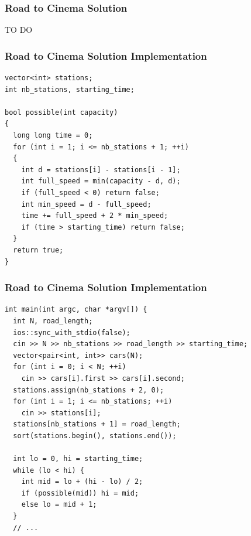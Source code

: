 \documentclass{beamer}
\newcommand{\codeforceslink}[2]{CodeForces (http://www.codeforces.com)
  problem: \href{#2}{\textcolor{blue}{#1}.}}
\newcounter{exo}
\newcommand{\exo}{
  \addtocounter{exo}{1}
  Exercice \arabic{exo}
}
\begin{document}
\fi



\ifanswers

\begin{frame}%
\frametitle{Road to Cinema Solution}

TO DO

\end{frame}

\begin{frame}[containsverbatim]
\frametitle{Road to Cinema Solution Implementation}
\scriptsize

\begin{lstlisting}[mathescape]
vector<int> stations;
int nb_stations, starting_time;

bool possible(int capacity)
{
  long long time = 0;
  for (int i = 1; i <= nb_stations + 1; ++i)
  {
    int d = stations[i] - stations[i - 1];
    int full_speed = min(capacity - d, d);
    if (full_speed < 0) return false;
    int min_speed = d - full_speed;
    time += full_speed + 2 * min_speed;
    if (time > starting_time) return false;
  }
  return true;
}
\end{lstlisting}

\end{frame}

\begin{frame}[containsverbatim]
\frametitle{Road to Cinema Solution Implementation}
\scriptsize

\begin{lstlisting}[mathescape]
int main(int argc, char *argv[]) {
  int N, road_length;
  ios::sync_with_stdio(false);
  cin >> N >> nb_stations >> road_length >> starting_time;
  vector<pair<int, int>> cars(N);
  for (int i = 0; i < N; ++i)
    cin >> cars[i].first >> cars[i].second;
  stations.assign(nb_stations + 2, 0);
  for (int i = 1; i <= nb_stations; ++i)
    cin >> stations[i];
  stations[nb_stations + 1] = road_length;
  sort(stations.begin(), stations.end());

  int lo = 0, hi = starting_time;
  while (lo < hi) {
    int mid = lo + (hi - lo) / 2;
    if (possible(mid)) hi = mid;
    else lo = mid + 1;
  }
  // ...
\end{lstlisting}

\end{frame}
\end{document}
